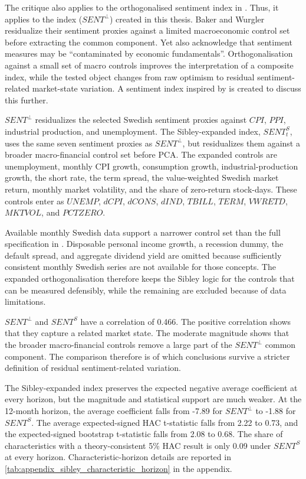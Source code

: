 \documentclass[11pt]{article}
\newcommand{\var}[1]{\ensuremath{#1}}
\begin{document}
The critique also applies to the orthogonalised sentiment index in \citet{baker2006sentiment}. Thus, it applies to the index (\var{SENT^{\perp}}) created in this thesis. Baker and Wurgler residualize their sentiment proxies against a limited macroeconomic control set before extracting the common component. Yet \citet{baker2007} also acknowledge that sentiment measures may be \enquote{contaminated by economic fundamentals}. Orthogonalisation against a small set of macro controls improves the interpretation of a composite index, while the tested object changes from raw optimism to residual sentiment-related market-state variation. A sentiment index inspired by \citet{sibley2012sentimental} is created to discuss this further.

\var{SENT^{\perp}} residualizes the selected Swedish sentiment proxies against \var{CPI}, \var{PPI}, industrial production, and unemployment. The Sibley-expanded index, \var{SENT^{S}_{t}}, uses the same seven sentiment proxies as \var{SENT^{\perp}}, but residualizes them against a broader macro-financial control set before PCA. The expanded controls are unemployment, monthly CPI growth, consumption growth, industrial-production growth, the short rate, the term spread, the value-weighted Swedish market return, monthly market volatility, and the share of zero-return stock-days. These controls enter as \var{UNEMP}, \var{dCPI}, \var{dCONS}, \var{dIND}, \var{TBILL}, \var{TERM}, \var{VWRETD}, \var{MKTVOL}, and \var{PCTZERO}.

Available monthly Swedish data support a narrower control set than the full specification in \citet{sibley2012sentimental}. Disposable personal income growth, a recession dummy, the default spread, and aggregate dividend yield are omitted because sufficiently consistent monthly Swedish series are not available for those concepts. The expanded orthogonalisation therefore keeps the Sibley logic for the controls that can be measured defensibly, while the remaining are excluded because of data limitations.

\var{SENT^{\perp}} and \var{SENT^{S}} have a correlation of 0.466. The positive correlation shows that they capture a related market state. The moderate magnitude shows that the broader macro-financial controls remove a large part of the \var{SENT^{\perp}} common component. The comparison therefore is of which conclusions survive a stricter definition of residual sentiment-related variation.

The Sibley-expanded index preserves the expected negative average coefficient at every horizon, but the magnitude and statistical support are much weaker. At the 12-month horizon, the average coefficient falls from -7.89 for \var{SENT^{\perp}} to -1.88 for \var{SENT^{S}}. The average expected-signed HAC t-statistic falls from 2.22 to 0.73, and the expected-signed bootstrap t-statistic falls from 2.08 to 0.68. The share of characteristics with a theory-consistent 5\% HAC result is only 0.09 under \var{SENT^{S}} at every horizon. Characteristic-horizon details are reported in \cref{tab:appendix_sibley_characteristic_horizon} in the appendix.
\end{document}
